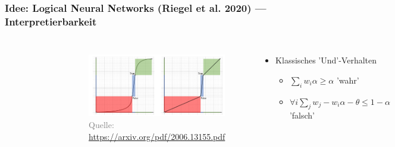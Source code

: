 \documentclass[aspectratio=169]{beamer}
\begin{document}
\begin{frame}\frametitle{Idee: Logical Neural Networks (Riegel et al. 2020) --- Interpretierbarkeit}
\begin{columns}
        \begin{figure}
            \centering
            \includegraphics[trim={0 4cm 21cm 4cm },clip,width=\linewidth]{8_LNN.png}
        \end{figure}
        \begin{figure}
            \centering
            \includegraphics[width=\linewidth]{classical_region.png}
            \tiny \textcolor{gray}{Quelle: \url{https://arxiv.org/pdf/2006.13155.pdf}}
        \end{figure}
        \begin{itemize}
            \item Klassisches 'Und'-Verhalten 
            \begin{itemize}
                \item $\displaystyle \sum_i w_i \alpha \geq \alpha$ 'wahr'
                \item $\displaystyle \forall i \sum_j w_j - w_i \alpha - \theta \leq 1-\alpha $ 'falsch'
            \end{itemize}
        \end{itemize}
\end{columns}
\end{frame}
\end{document}
